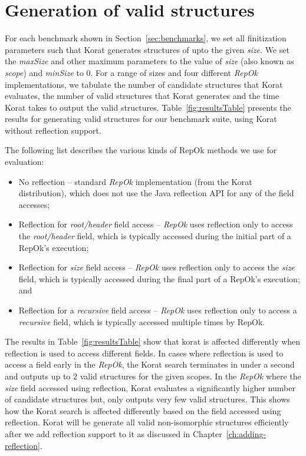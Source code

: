 \section{Generation of valid structures}
\label{sec:generation-of-valid-structures}
For each benchmark shown in Section~\ref{sec:benchmarks}, we set all
finitization parameters such that Korat generates structures of upto the
given \emph{size}. We set the \emph{maxSize} and other maximum
parameters to the value of \emph{size} (also known as \emph{scope})
and \emph{minSize} to 0. For a range of sizes and four different
\emph{RepOk} implementations, we tabulate the number of candidate
structures that Korat evaluates, the number of valid structures that
Korat generates and the time Korat takes to output the valid
structures. Table~\ref{fig:resultsTable} presents the results for
generating valid structures for our benchmark suite, using Korat
without reflection support.

\par
\noindent The following list describes the various kinds of RepOk
methods we use for evaluation:
\begin{itemize}
\item No reflection -- standard \emph{RepOk} implementation (from the
  Korat distribution), which does not use the Java reflection API for
  any of the field accesses;
\item Reflection for \emph{root/header} field access -- \emph{RepOk}
  uses reflection only to access the \emph{root/header} field, which
  is typically accessed during the initial part of a RepOk's
  execution;
\item Reflection for \emph{size} field access -- \emph{RepOk} uses
  reflection only to access the \emph{size} field, which is typically
  accessed during the final part of a RepOk's execution; and
\item Reflection for a \emph{recursive} field access -- \emph{RepOk}
  uses reflection only to access a \emph{recursive} field, which is
  typically accessed multiple times by RepOk.
\end{itemize}

\para The results in Table~\ref{fig:resultsTable} show that korat is
affected differently when reflection is used to access different
fields. In cases where reflection is used to access a field early in
the \emph{RepOk}, the Korat search terminates in under a second and
outputs up to 2 valid structures for the given scopes. In the
\emph{RepOk} where the \emph{size} field accessed using reflection,
Korat evaluates a significantly higher number of candidate structures
but, only outputs very few valid structures. This shows how the Korat
search is affected differently based on the field accessed using
reflection. Korat will be generate all valid non-isomorphic structures
efficiently after we add reflection support to it as discussed in
Chapter~\ref{ch:adding-reflection}.


